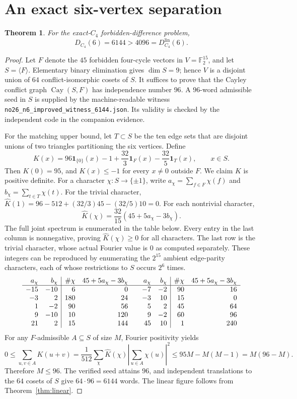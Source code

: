 \documentclass[11pt,a4paper]{article}
\newtheorem{theorem}{Theorem}
\newcommand{\F}{\mathbb{F}}
\begin{document}
\section{An exact six-vertex separation}
\begin{theorem}\label{thm:six}
For the exact-$C_4$ forbidden-difference problem,
\[
\boxed{D_{C_4}(6)=6144>4096=D_{C_4}^{\mathrm{lin}}(6).}
\]
\end{theorem}
\begin{proof}
Let $F$ denote the $45$ forbidden four-cycle vectors in $V=\F_2^{15}$, and let
$S=\langle F\rangle$. Elementary binary elimination gives $\dim S=9$; hence
$V$ is a disjoint union of $64$ conflict-isomorphic cosets of $S$. It suffices
to prove that the Cayley conflict graph $\operatorname{Cay}(S,F)$ has independence
number $96$. A $96$-word admissible seed in $S$ is supplied by the machine-readable
witness \texttt{no26\_n6\_improved\_witness\_6144.json}. Its validity is checked
by the independent code in the companion evidence.

For the matching upper bound, let $T\subset S$ be the ten edge sets that are
disjoint unions of two triangles partitioning the six vertices. Define
\[
K(x)=96\mathbf{1}_{\{0\}}(x)-1+
\frac{32}{3}\mathbf{1}_F(x)-\frac{32}{5}\mathbf{1}_T(x),\qquad x\in S.
\]
Then $K(0)=95$, and $K(x)\le-1$ for every $x\ne0$ outside $F$.
We claim $K$ is positive definite. For a character $\chi:S\to\{\pm1\}$,
write $a_\chi=\sum_{f\in F}\chi(f)$ and
$b_\chi=\sum_{t\in T}\chi(t)$. For the trivial character,
$\widehat K(1)=96-512+(32/3)45-(32/5)10=0$. For each nontrivial
character,
\[
\widehat K(\chi)=\frac{32}{15}(45+5a_\chi-3b_\chi).
\]
The full joint spectrum is enumerated in the table below. Every entry in the
last column is nonnegative, proving $\widehat K(\chi)\ge0$ for all characters.
The last row is the trivial character, whose actual Fourier value is $0$ as
computed separately. These integers can be reproduced by enumerating the
$2^{15}$ ambient edge-parity characters, each of whose restrictions to $S$
occurs $2^6$ times.
\[
\begin{array}{rr|rr@{\qquad}rr|rr}
 a_\chi & b_\chi & \#\chi & 45+5a_\chi-3b_\chi &
 a_\chi & b_\chi & \#\chi & 45+5a_\chi-3b_\chi\\\hline
 -15&-10&6&0 & -7&-2&90&16\\
 -3&2&180&24 & -3&10&15&0\\
 1&-2&90&56 & 5&2&45&64\\
 9&-10&10&120 & 9&-2&60&96\\
 21&2&15&144 & 45&10&1&240
\end{array}
\]
For any $F$-admissible $A\subseteq S$ of size $M$, Fourier positivity yields
\[
0\le\sum_{u,v\in A}K(u+v)
=\frac{1}{512}\sum_{\chi}\widehat K(\chi)
\left|\sum_{u\in A}\chi(u)\right|^2
\le 95M-M(M-1)=M(96-M).
\]
Therefore $M\le96$. The verified seed attains $96$, and independent
translations to the $64$ cosets of $S$ give $64\cdot96=6144$ words.
The linear figure follows from Theorem~\ref{thm:linear}.
\end{proof}
\end{document}
